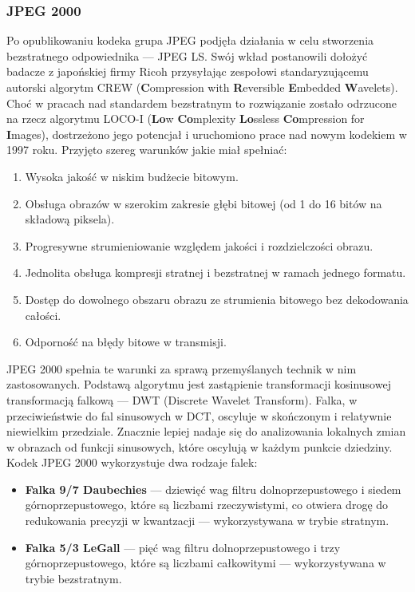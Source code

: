 \subsubsection{JPEG 2000}
Po opublikowaniu kodeka grupa JPEG podjęła działania w celu stworzenia bezstratnego odpowiednika --- JPEG LS. Swój wkład postanowili dołożyć badacze z japońskiej firmy Ricoh przysyłając zespołowi standaryzującemu autorski algorytm CREW (\textbf{C}ompression with \textbf{R}eversible \textbf{E}mbedded \textbf{W}avelets). Choć w pracach nad standardem bezstratnym to rozwiązanie zostało odrzucone na rzecz algorytmu LOCO-I (\textbf{Lo}w \textbf{Co}mplexity \textbf{Lo}ssless \textbf{Co}mpression for \textbf{I}mages), dostrzeżono jego potencjał i uruchomiono prace nad nowym kodekiem w 1997 roku. Przyjęto szereg warunków jakie miał spełniać\cite{Taubman2002}:
\begin{enumerate}
	\item \label{jakosc-bitrate} Wysoka jakość w niskim budżecie bitowym.
	\item \label{glebia} Obsługa obrazów w szerokim zakresie głębi bitowej (od 1 do 16 bitów na składową piksela).
	\item \label{progresja} Progresywne strumieniowanie względem jakości i rozdzielczości obrazu.
	\item \label{stratna-bezstratna} Jednolita obsługa kompresji stratnej i bezstratnej w ramach jednego formatu.
	\item \label{swobodny-dostep} Dostęp do dowolnego obszaru obrazu ze strumienia bitowego bez dekodowania całości.
	\item \label{odpornosc} Odporność na błędy bitowe w transmisji.
\end{enumerate}
JPEG 2000 spełnia te warunki za sprawą przemyślanych technik w nim zastosowanych. Podstawą algorytmu jest zastąpienie transformacji kosinusowej transformacją falkową --- DWT (Discrete Wavelet Transform). Falka, w przeciwieństwie do fal sinusowych w DCT, oscyluje w skończonym i relatywnie niewielkim przedziale. Znacznie lepiej nadaje się do analizowania lokalnych zmian w obrazach od funkcji sinusowych, które oscylują w każdym punkcie dziedziny. Kodek JPEG 2000 wykorzystuje dwa rodzaje falek:
\begin{itemize}
	\item \textbf{Falka 9/7 Daubechies} --- dziewięć wag filtru dolnoprzepustowego i siedem górnoprzepustowego, które są liczbami rzeczywistymi, co otwiera drogę do redukowania precyzji w kwantzacji --- wykorzystywana w trybie stratnym.
	\item \textbf{Falka 5/3 LeGall} --- pięć wag filtru dolnoprzepustowego i trzy górnoprzepustowego, które są liczbami całkowitymi --- wykorzystywana w trybie bezstratnym.
\end{itemize}

